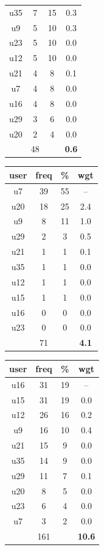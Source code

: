\begin{table}
\begin{tabular}{ |c|c|c|c| }
	u35 & 7 & 15 & 0.3 \\
	u9 & 5 & 10 & 0.3 \\
	u23 & 5 & 10 & 0.0 \\
	u12 & 5 & 10 & 0.0 \\
	u21 & 4 & 8 & 0.1 \\
	u7 & 4 & 8 & 0.0 \\
	u16 & 4 & 8 & 0.0 \\
	u29 & 3 & 6 & 0.0 \\
	u20 & 2 & 4 & 0.0 \\
	 & 48 & & \textbf{0.6} \\
	\hline
\end{tabular}
\begin{tabular}{ |c|c|c|c| }
	\hline
	\textbf{user} & \textbf{freq} & \textbf{\%} & \textbf{wgt} \\
	\hline
	u7 & 39 & 55 & -- \\
	u20 & 18 & 25 & 2.4 \\
	u9 & 8 & 11 & 1.0 \\
	u29 & 2 & 3 & 0.5 \\
	u21 & 1 & 1 & 0.1 \\
	u35 & 1 & 1 & 0.0 \\
	u12 & 1 & 1 & 0.0 \\
	u15 & 1 & 1 & 0.0 \\
	u16 & 0 & 0 & 0.0 \\
	u23 & 0 & 0 & 0.0 \\
	 & 71 & & \textbf{4.1} \\
	\hline
\end{tabular}
\begin{tabular}{ |c|c|c|c| }
	\hline
	\textbf{user} & \textbf{freq} & \textbf{\%} & \textbf{wgt} \\
	\hline
	u16 & 31 & 19 & -- \\
	u15 & 31 & 19 & 0.0 \\
	u12 & 26 & 16 & 0.2 \\
	u9 & 16 & 10 & 0.4 \\
	u21 & 15 & 9 & 0.0 \\
	u35 & 14 & 9 & 0.0 \\
	u29 & 11 & 7 & 0.1 \\
	u20 & 8 & 5 & 0.0 \\
	u23 & 6 & 4 & 0.0 \\
	u7 & 3 & 2 & 0.0 \\
	 & 161 & & \textbf{10.6} \\
	\hline
\end{tabular}

\end{table}
